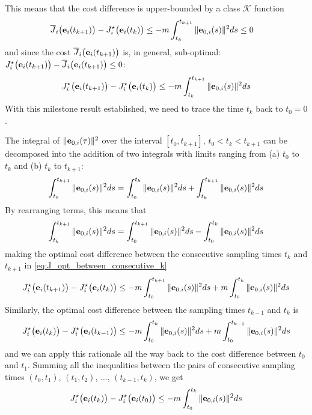 This means that the cost difference is upper-bounded by a class $\mathcal{K}$
function
\begin{align}
  \overline{J}_i\big(\bm{\mathbf{e}}_i(t_{k+1})\big) - J_i^{\star}\big(\bm{\mathbf{e}}_i(t_k)\big)
  &\leq -m \int_{t_k}^{t_{k+1}} \|\bm{\mathbf{e}}_{0,i}(s)\|^2 ds \leq 0
\end{align}
and since the cost $\overline{J}_i\big(\bm{\mathbf{e}}_i(t_{k+1})\big)$ is, in general,
sub-optimal: $J_i^{\star}\big(\bm{\mathbf{e}}_i(t_{k+1})\big) - \overline{J}_i\big(\bm{\mathbf{e}}_i(t_{k+1})\big) \leq 0$:
\begin{align}
 J_i^{\star}\big(\bm{\mathbf{e}}_i(t_{k+1})\big) - J_i^{\star}\big(\bm{\mathbf{e}}_i(t_k)\big) \leq -m \int_{t_k}^{t_{k+1}} \|\bm{\mathbf{e}}_{0,i}(s)\|^2 ds
 \label{eq:J_opt_between_consecutive_k}
\end{align}
With this milestone result established, we need to trace the time $t_k$ back
to $t_0 = 0$.

\begin{gg_box}
  The integral of $\|\bm{\mathbf{e}}_{0,i}(\tau)\|^2$ over the interval $[t_0, t_{k+1}]$,
  $t_0 < t_k < t_{k+1}$ can be decomposed into the addition of two integrals
  with limits ranging from (a) $t_0$ to $t_k$ and (b) $t_k$ to $t_{k+1}$:
  \begin{align}
    \int_{t_0}^{t_{k+1}} \|\bm{\mathbf{e}}_{0,i}(s)\|^2 ds = \int_{t_0}^{t_{k}} \|\bm{\mathbf{e}}_{0,i}(s)\|^2 ds + \int_{t_k}^{t_{k+1}} \|\bm{\mathbf{e}}_{0,i}(s)\|^2 ds
  \end{align}
  By rearranging terms, this means that
  \begin{align}
    \int_{t_k}^{t_{k+1}} \|\bm{\mathbf{e}}_{0,i}(s)\|^2 ds = \int_{t_0}^{t_{k+1}} \|\bm{\mathbf{e}}_{0,i}(s)\|^2 ds - \int_{t_0}^{t_{k}} \|\bm{\mathbf{e}}_{0,i}(s)\|^2 ds
  \end{align}
  making the optimal cost difference between the consecutive sampling times
  $t_k$ and $t_{k+1}$ in \eqref{eq:J_opt_between_consecutive_k}
  \begin{align}
    J_i^{\star}\big(\bm{\mathbf{e}}_i(t_{k+1})\big) - J_i^{\star}\big(\bm{\mathbf{e}}_i(t_k)\big) \leq
      -m \int_{t_0}^{t_{k+1}} \|\bm{\mathbf{e}}_{0,i}(s)\|^2 ds +m \int_{t_0}^{t_{k}} \|\bm{\mathbf{e}}_{0,i}(s)\|^2 ds
  \end{align}
  Similarly, the optimal cost difference between the sampling times $t_{k-1}$
  and $t_{k}$ is
  \begin{align}
    J_i^{\star}\big(\bm{\mathbf{e}}_i(t_{k})\big) - J_i^{\star}\big(\bm{\mathbf{e}}_i(t_{k-1})\big) \leq
      -m \int_{t_0}^{t_{k}} \|\bm{\mathbf{e}}_{0,i}(s)\|^2 ds +m \int_{t_0}^{t_{k-1}} \|\bm{\mathbf{e}}_{0,i}(s)\|^2 ds
  \end{align}
  and we can apply this rationale all the way back to the cost difference
  between $t_0$ and $t_1$. Summing all the inequalities between the pairs of
  consecutive sampling times $(t_0, t_1)$, $(t_1, t_2)$, $\dots$,
  $(t_{k-1}, t_k)$, we get
  \begin{align}
    J_i^{\star}\big(\bm{\mathbf{e}}_i(t_{k})\big) - J_i^{\star}\big(\bm{\mathbf{e}}_i(t_0)\big) \leq
      -m \int_{t_0}^{t_{k}} \|\bm{\mathbf{e}}_{0,i}(s)\|^2 ds
  \end{align}
\end{gg_box}


